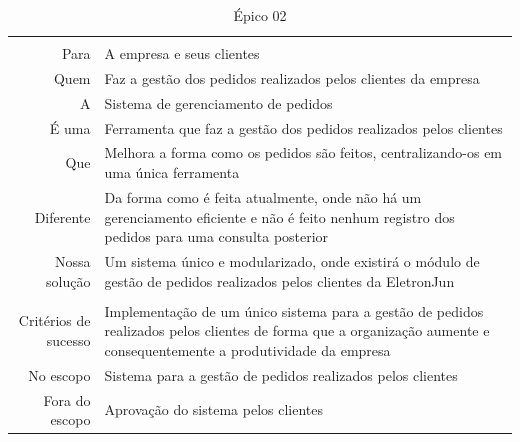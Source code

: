 \begin{table}[]
\centering
\label{label-epico02}
\begin{tabular}{
>{\columncolor[HTML]{96FFFB}}r l}
\multicolumn{2}{c}{\cellcolor[HTML]{34CDF9}Gerenciamento de pedidos}                                                                                                                                 \\
Para                 & A empresa e seus clientes                                                                                                                                            \\
Quem                 & Faz a gestão dos pedidos realizados pelos clientes da empresa                                                                                                                                 \\
A                    & Sistema de gerenciamento de pedidos                                                                                                                                  \\
É uma                & Ferramenta que faz a gestão dos pedidos realizados pelos clientes                                                                                                    \\
Que                  & Melhora a forma como os pedidos são feitos, centralizando-os em uma única ferramenta                     \\
Diferente            & Da forma como é feita atualmente, onde não há um gerenciamento eficiente e não é feito nenhum registro dos pedidos para uma consulta posterior                       \\
Nossa solução        & Um sistema único e modularizado, onde existirá o módulo de gestão de pedidos realizados pelos clientes da EletronJun                                                 \\
\multicolumn{2}{c}{\cellcolor[HTML]{34CDF9}Escopo}                                                                                                                                          \\
Critérios de sucesso & Implementação de um único sistema para a gestão de pedidos realizados pelos clientes de forma que a organização aumente e consequentemente a produtividade da empresa \\
No escopo            & Sistema para a gestão de pedidos realizados pelos clientes                                                                                                           \\
Fora do escopo       & Aprovação do sistema pelos clientes                                                                                                                                 
\end{tabular}
\caption{Épico 02}
\end{table}

